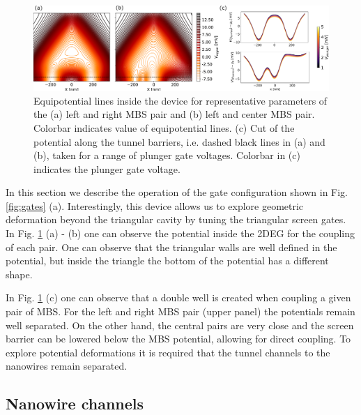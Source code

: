 \begin{figure}
\centering
  \includegraphics[width=\linewidth]{figures/device_1_potential.pdf}
  \caption{Equipotential lines inside the device for representative parameters of the (a) left and right MBS pair and (b) left and center MBS pair. Colorbar indicates value of equipotential lines. (c) Cut of the potential along the tunnel barriers, i.e. dashed black lines in (a) and (b), taken for a range of plunger gate voltages. Colorbar in (c) indicates the plunger gate voltage.}
  \label{fig:device_1_barriers}
\end{figure}

In this section we describe the operation of the gate configuration shown in Fig. \ref{fig:gates} (a).
Interestingly, this device allows us to explore geometric deformation beyond the triangular cavity by tuning the triangular screen gates.
In Fig.  \ref{fig:device_1_barriers} (a) - (b) one can observe the potential inside the 2DEG for the coupling of each pair.
One can observe that the triangular walls are well defined in the potential, but inside the triangle the bottom of the potential has a different shape.

In Fig. \ref{fig:device_1_barriers} (c) one can observe that a double well is created when coupling a given pair of MBS.
For the left and right MBS pair (upper panel) the potentials remain well separated.
On the other hand, the central pairs are very close and the screen barrier can be lowered below the MBS potential, allowing for direct coupling.
To explore potential deformations it is required that the tunnel channels to the nanowires remain separated.

\subsection{Nanowire channels}

